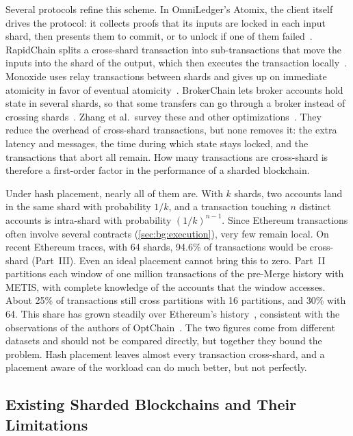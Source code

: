 Several protocols refine this scheme.
In OmniLedger's Atomix, the client itself drives the protocol: it collects proofs that its inputs are locked in each input shard, then presents them to commit, or to unlock if one of them failed~\cite{omniLedger}.
RapidChain splits a cross-shard transaction into sub-transactions that move the inputs into the shard of the output, which then executes the transaction locally~\cite{rapidchain}.
Monoxide uses relay transactions between shards and gives up on immediate atomicity in favor of eventual atomicity~\cite{wang2019monoxide}.
BrokerChain lets broker accounts hold state in several shards, so that some transfers can go through a broker instead of crossing shards~\cite{huang2022brokerchain}.
Zhang et al.\ survey these and other optimizations~\cite{zhang2025survey}.
They reduce the overhead of cross-shard transactions, but none removes it: the extra latency and messages, the time during which state stays locked, and the transactions that abort all remain.
How many transactions are cross-shard is therefore a first-order factor in the performance of a sharded blockchain.

Under hash placement, nearly all of them are.
With $k$ shards, two accounts land in the same shard with probability $1/k$, and a transaction touching $n$ distinct accounts is intra-shard with probability $(1/k)^{n-1}$.
Since Ethereum transactions often involve several contracts (\autoref{sec:bg:execution}), very few remain local.
On recent Ethereum traces, with 64 shards, 94.6\% of transactions would be cross-shard (Part~III). 
Even an ideal placement cannot bring this to zero.
Part~II partitions each window of one million transactions of the pre-Merge history with METIS, with complete knowledge of the accounts that the window accesses.
About 25\% of transactions still cross partitions with 16 partitions, and 30\% with 64.
This share has grown steadily over Ethereum's history~\cite{pigaglio2023exploring}, consistent with the observations of the authors of OptChain~\cite{Nguyen2019}. 
The two figures come from different datasets and should not be compared directly, but together they bound the problem.
Hash placement leaves almost every transaction cross-shard, and a placement aware of the workload can do much better, but not perfectly.

\subsection{Existing Sharded Blockchains and Their Limitations}\label{sec:bg:sharding:limitations}

